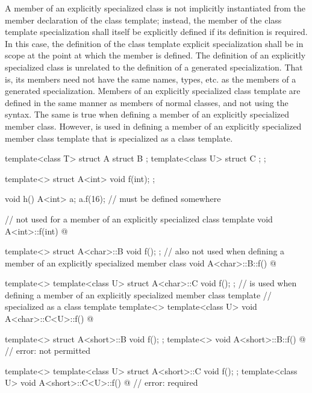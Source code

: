 \pnum
A member of an explicitly specialized class is not implicitly
instantiated from the member declaration of the class template;
instead, the member of the class template specialization shall itself be
explicitly defined if its definition is required.
In this case, the definition of the class template explicit specialization
shall be in scope at the point at which the member is defined.
The definition of an explicitly specialized class is unrelated to the
definition of a generated specialization.
That is, its members need
not have the same names, types, etc. as the members of a generated
specialization.
Members of an explicitly specialized
class template are defined in the same manner as members of normal classes, and
not using the  syntax.
The same is true when defining a member of an explicitly specialized member
class. However,  is used in defining a member of an explicitly
specialized member class template that is specialized as a class template.
\begin{example}
\begin{codeblock}
template<class T> struct A {
  struct B { };
  template<class U> struct C { };
};

template<> struct A<int> {
  void f(int);
};

void h() {
  A<int> a;
  a.f(16);          //  must be defined somewhere
}

//  not used for a member of an explicitly specialized class template
void A<int>::f(int) { @\commentellip@ }

template<> struct A<char>::B {
  void f();
};
//  also not used when defining a member of an explicitly specialized member class
void A<char>::B::f() { @\commentellip@ }

template<> template<class U> struct A<char>::C {
  void f();
};
//  is used when defining a member of an explicitly specialized member class template
// specialized as a class template
template<>
template<class U> void A<char>::C<U>::f() { @\commentellip@ }

template<> struct A<short>::B {
  void f();
};
template<> void A<short>::B::f() { @\commentellip@ }              // error:  not permitted

template<> template<class U> struct A<short>::C {
  void f();
};
template<class U> void A<short>::C<U>::f() { @\commentellip@ }    // error:  required
\end{codeblock}
\end{example}

